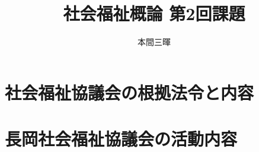 \documentclass[titlepage,a4paper]{jsarticle}
\title{社会福祉概論 第2回課題}
\author{本間三暉}
\begin{document}
\maketitle
\section{社会福祉協議会の根拠法令と内容}

\section{長岡社会福祉協議会の活動内容}

\end{document}
